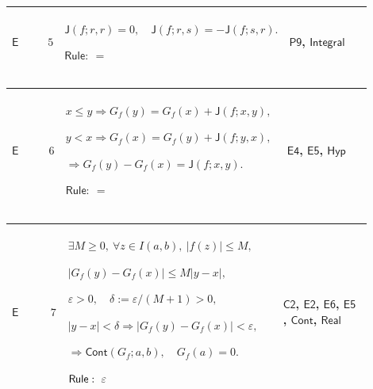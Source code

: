 \documentclass[12pt,reqno]{amsart}
\theoremstyle{blueplain}
\numberwithin{equation}{section}
\begin{document}
{\scriptsize \setlength{\parskip}{0pt}\nointerlineskip
\noindent 
\begin{tabular}{|@{}>{\centering\arraybackslash}m{0.10658\linewidth}|>{\centering\arraybackslash}m{0.03553\linewidth}|>{\centering\arraybackslash}m{0.52105\linewidth}|>{\centering\arraybackslash}m{0.23684\linewidth}|}
\hline
\hypertarget{proof:E5}{$\displaystyle \mathsf{E}$} & $\displaystyle 5$ & $%
\displaystyle \mathsf{J}(f;r,r)=0,\quad\mathsf{J}(f;r,s)=-\mathsf{J}(f;s,r).$%
\par$\displaystyle \mathsf{Rule}:\ =$ & \hyperlink{proof:P9}{$\displaystyle 
\mathsf{P9}$}, \hyperlink{def:Integral}{$\displaystyle \mathsf{Integral}$}
\\ \hline
\end{tabular}%
}

{\scriptsize \setlength{\parskip}{0pt}\nointerlineskip
\noindent 
\begin{tabular}{|@{}>{\centering\arraybackslash}m{0.10658\linewidth}|>{\centering\arraybackslash}m{0.03553\linewidth}|>{\centering\arraybackslash}m{0.52105\linewidth}|>{\centering\arraybackslash}m{0.23684\linewidth}|}
\hline
\hypertarget{proof:E6}{$\displaystyle \mathsf{E}$} & $\displaystyle 6$ & $%
\displaystyle x\le y\Rightarrow G_f(y)=G_f(x)+\mathsf{J}(f;x,y),$\par$%
\displaystyle y<x\Rightarrow G_f(x)=G_f(y)+\mathsf{J}(f;y,x),$\par$%
\displaystyle \Rightarrow G_f(y)-G_f(x)=\mathsf{J}(f;x,y).$\par$%
\displaystyle \mathsf{Rule}:\ =$ & \hyperlink{proof:E4}{$\displaystyle 
\mathsf{E4}$}, \hyperlink{proof:E5}{$\displaystyle \mathsf{E5}$}, \hyperlink{def:Hyp}%
{$\displaystyle \mathsf{Hyp}$} \\ \hline
\end{tabular}%
}

{\scriptsize \setlength{\parskip}{0pt}\nointerlineskip
\noindent 
\begin{tabular}{|@{}>{\centering\arraybackslash}m{0.10658\linewidth}|>{\centering\arraybackslash}m{0.03553\linewidth}|>{\centering\arraybackslash}m{0.52105\linewidth}|>{\centering\arraybackslash}m{0.23684\linewidth}|}
\hline
\hypertarget{proof:E7}{$\displaystyle \mathsf{E}$} & $\displaystyle 7$ & $%
\displaystyle \exists M\ge0,\ \forall z\in I(a,b),\ |f(z)|\le M,$\par$%
\displaystyle |G_f(y)-G_f(x)|\le M|y-x|,$\par$\displaystyle %
\varepsilon>0,\quad\delta:=\varepsilon/(M+1)>0,$\par$\displaystyle %
|y-x|<\delta\Rightarrow|G_f(y)-G_f(x)|<\varepsilon,$\par$\displaystyle %
\Rightarrow\mathsf{Cont}(G_f;a,b),\quad G_f(a)=0.$\par$\displaystyle \mathsf{%
Rule}:\ \varepsilon$ & \hyperlink{proof:C2}{$\displaystyle \mathsf{C2}$}, 
\hyperlink{proof:E2}{$\displaystyle \mathsf{E2}$}, \hyperlink{proof:E6}{$%
\displaystyle \mathsf{E6}$}, \hyperlink{proof:E5}{$\displaystyle \mathsf{E5}$%
}, \hyperlink{def:Cont}{$\displaystyle \mathsf{Cont}$}, \hyperlink{ax:Real}{$%
\displaystyle \mathsf{Real}$} \\ \hline
\end{tabular}%
}
\end{document}
